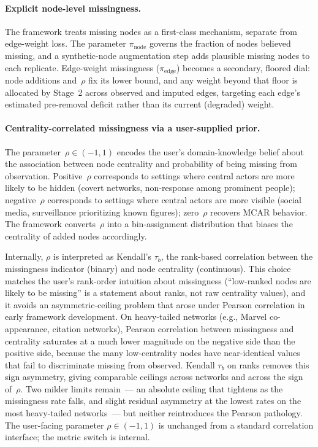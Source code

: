\documentclass[11pt]{article}
\newcommand{\pinode}{\pi_{\text{node}}}
\newcommand{\piedge}{\pi_{\text{edge}}}
\begin{document}
\paragraph{Explicit node-level missingness.} The framework treats missing nodes as a first-class mechanism, separate from edge-weight loss. The parameter $\pinode$ governs the fraction of nodes believed missing, and a synthetic-node augmentation step adds plausible missing nodes to each replicate. Edge-weight missingness ($\piedge$) becomes a secondary, floored dial: node additions and~$\rho$ fix its lower bound, and any weight beyond that floor is allocated by Stage~2 across observed and imputed edges, targeting each edge's estimated pre-removal deficit rather than its current (degraded) weight.

\paragraph{Centrality-correlated missingness via a user-supplied prior.} The parameter~$\rho \in (-1, 1)$ encodes the user's domain-knowledge belief about the association between node centrality and probability of being missing from observation. Positive~$\rho$ corresponds to settings where central actors are more likely to be hidden (covert networks, non-response among prominent people); negative~$\rho$ corresponds to settings where central actors are more visible (social media, surveillance prioritizing known figures); zero~$\rho$ recovers MCAR behavior. The framework converts~$\rho$ into a bin-assignment distribution that biases the centrality of added nodes accordingly.

Internally, $\rho$ is interpreted as Kendall's $\tau_b$, the rank-based correlation between the missingness indicator (binary) and node centrality (continuous). This choice matches the user's rank-order intuition about missingness (``low-ranked nodes are likely to be missing'' is a statement about ranks, not raw centrality values), and it avoids an asymmetric-ceiling problem that arose under Pearson correlation in early framework development. On heavy-tailed networks (e.g., Marvel co-appearance, citation networks), Pearson correlation between missingness and centrality saturates at a much lower magnitude on the negative side than the positive side, because the many low-centrality nodes have near-identical values that fail to discriminate missing from observed. Kendall $\tau_b$ on ranks removes this sign asymmetry, giving comparable ceilings across networks and across the sign of~$\rho$. Two milder limits remain~--- an absolute ceiling that tightens as the missingness rate falls, and slight residual asymmetry at the lowest rates on the most heavy-tailed networks~--- but neither reintroduces the Pearson pathology. The user-facing parameter $\rho \in (-1, 1)$ is unchanged from a standard correlation interface; the metric switch is internal.
\end{document}
